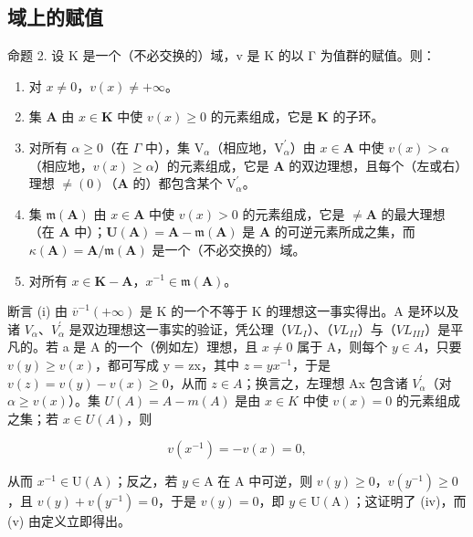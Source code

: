 \subsection{域上的赋值}

命题 2. 设 K 是一个（不必交换的）域，v 是 K 的以 Γ 为值群的赋值。则：

\begin{enumerate}
\def\labelenumi{(\roman{enumi})}
\item
  对 \(x \neq 0\)，\(v(x) \neq +\infty\)。
\item
  集 \(\mathbf{A}\) 由 \(x\in \mathbf{K}\) 中使 \(v(x)\geqslant 0\) 的元素组成，它是 \(\mathbf{K}\) 的子环。
\item
  对所有 \(\alpha \geqslant 0\)（在 \(\Gamma\) 中），集 \(\mathrm{V}_{\alpha}\)（相应地，\(\mathrm{V}_{\alpha}^{\prime}\)）由 \(x \in \mathbf{A}\) 中使 \(v(x) > \alpha\)（相应地，\(v(x) \geqslant \alpha\)）的元素组成，它是 \(\mathbf{A}\) 的双边理想，且每个（左或右）理想 \(\neq (0)\)（\(\mathbf{A}\) 的）都包含某个 \(\mathrm{V}_{\alpha}^{\prime}\)。
\item
  集 \(\mathfrak{m}(\mathbf{A})\) 由 \(x \in \mathbf{A}\) 中使 \(v(x) > 0\) 的元素组成，它是 \(\neq \mathbf{A}\) 的最大理想（在 \(\mathbf{A}\) 中）；\(\mathbf{U}(\mathbf{A}) = \mathbf{A} - \mathfrak{m}(\mathbf{A})\) 是 \(\mathbf{A}\) 的可逆元素所成之集，而 \(\kappa(\mathbf{A}) = \mathbf{A} / \mathfrak{m}(\mathbf{A})\) 是一个（不必交换的）域。
\item
  对所有 \(x \in \mathbf{K} - \mathbf{A}\)，\(x^{-1} \in \mathfrak{m}(\mathbf{A})\)。
\end{enumerate}

断言 (i) 由 \(\overline{v}^{-1}(+\infty)\) 是 K 的一个不等于 K 的理想这一事实得出。A 是环以及诸 \(V_{\alpha}\)、\(V_{\alpha}^{\prime}\) 是双边理想这一事实的验证，凭公理（\(VL_{I}\)）、（\(VL_{II}\)）与（\(VL_{III}\)）是平凡的。若 a 是 A 的一个（例如左）理想，且 \(x \neq 0\) 属于 A，则每个 \(y \in A\)，只要 \(v(y) \geqslant v(x)\)，都可写成 y = zx，其中 \(z = yx^{-1}\)，于是 \(v(z) = v(y) - v(x) \geqslant 0\)，从而 \(z \in A\)；换言之，左理想 Ax 包含诸 \(V_{\alpha}^{\prime}\)（对 \(\alpha \geqslant v(x)\)）。集 \(U(A) = A - m(A)\) 是由 \(x \in K\) 中使 \(v(x) = 0\) 的元素组成之集；若 \(x \in U(A)\)，则

\[
v (x ^ {- 1}) = - v (x) = 0,
\]

从而 \(x^{-1} \in \mathrm{U}(\mathrm{A})\)；反之，若 \(y \in \mathrm{A}\) 在 \(\mathrm{A}\) 中可逆，则 \(v(y) \geqslant 0\)，\(v(y^{-1}) \geqslant 0\)，且 \(v(y) + v(y^{-1}) = 0\)，于是 \(v(y) = 0\)，即 \(y \in \mathrm{U}(\mathrm{A})\)；这证明了 (iv)，而 (v) 由定义立即得出。

